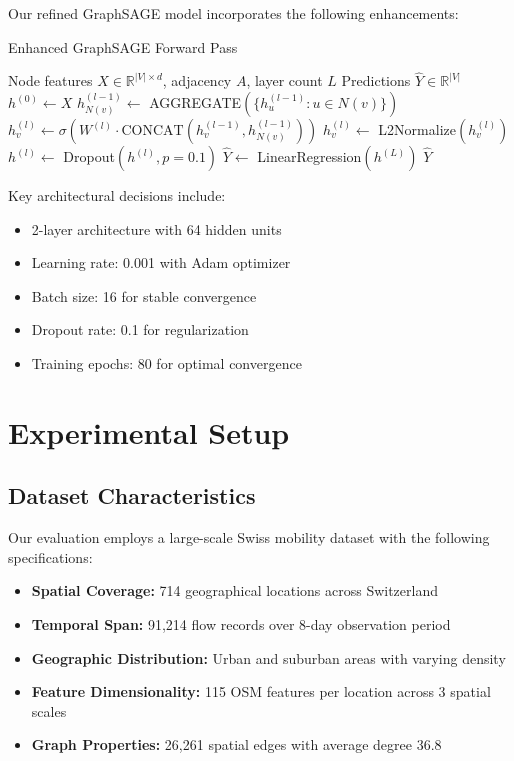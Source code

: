\documentclass[twocolumn,11pt]{IEEEtran}  %
\begin{document}
Our refined GraphSAGE model incorporates the following enhancements:

\begin{algorithm}
\caption{Enhanced GraphSAGE Forward Pass}
\label{alg:graphsage}
\begin{algorithmic}[1]
\REQUIRE Node features $X \in \mathbb{R}^{|V| \times d}$, adjacency $A$, layer count $L$
\ENSURE Predictions $\hat{Y} \in \mathbb{R}^{|V|}$
\STATE $h^{(0)} \leftarrow X$
        \STATE $h_{N(v)}^{(l-1)} \leftarrow$ AGGREGATE$(\{h_u^{(l-1)} : u \in N(v)\})$
        \STATE $h_v^{(l)} \leftarrow \sigma(W^{(l)} \cdot \text{CONCAT}(h_v^{(l-1)}, h_{N(v)}^{(l-1)}))$
        \STATE $h_v^{(l)} \leftarrow$ L2Normalize$(h_v^{(l)})$
    \ENDFOR
    \STATE $h^{(l)} \leftarrow$ Dropout$(h^{(l)}, p=0.1)$
\ENDFOR
\STATE $\hat{Y} \leftarrow$ LinearRegression$(h^{(L)})$
\RETURN $\hat{Y}$
\end{algorithmic}
\end{algorithm}

Key architectural decisions include:
\begin{itemize}
\item 2-layer architecture with 64 hidden units
\item Learning rate: 0.001 with Adam optimizer
\item Batch size: 16 for stable convergence
\item Dropout rate: 0.1 for regularization
\item Training epochs: 80 for optimal convergence
\end{itemize}

\section{Experimental Setup}

\subsection{Dataset Characteristics}

Our evaluation employs a large-scale Swiss mobility dataset with the following specifications:
\begin{itemize}
\item \textbf{Spatial Coverage:} 714 geographical locations across Switzerland
\item \textbf{Temporal Span:} 91,214 flow records over 8-day observation period
\item \textbf{Geographic Distribution:} Urban and suburban areas with varying density
\item \textbf{Feature Dimensionality:} 115 OSM features per location across 3 spatial scales
\item \textbf{Graph Properties:} 26,261 spatial edges with average degree 36.8
\end{itemize}
\end{document}
